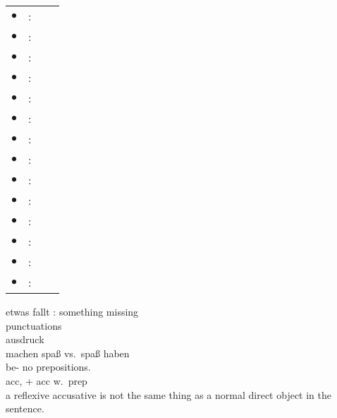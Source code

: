 \documentclass[a4paper,twocolumn,10pt]{article}
\begin{document}
\begin{tabularx}{0.95\linewidth}{lllX}
\rowcolor{white} $\bullet$                 & : &                                     & \\
\rowcolor{white} $\bullet$                 & : &                                     & \\
\rowcolor{white} $\bullet$                 & : &                                     & \\
\rowcolor{white} $\bullet$                 & : &                                     & \\
\rowcolor{white} $\bullet$                 & : &                                     & \\
\rowcolor{white} $\bullet$                 & : &                                     & \\
\rowcolor{white} $\bullet$                 & : &                                     & \\
\rowcolor{white} $\bullet$                 & : &                                     & \\
\rowcolor{white} $\bullet$                 & : &                                     & \\
\rowcolor{white} $\bullet$                 & : &                                     & \\
\rowcolor{white} $\bullet$                 & : &                                     & \\
\rowcolor{white} $\bullet$                 & : &                                     & \\
\rowcolor{white} $\bullet$                 & : &                                     & \\
\rowcolor{white} $\bullet$                 & : &                                     & \\



\end{tabularx}
\newline


etwas fallt : something missing\\
punctuations\\
ausdruck\\

machen spaß vs.\ spaß haben\\
be- no prepositions.\\

acc, + acc w.\ prep\\
a reflexive accusative is not the same thing as a normal direct object in the
sentence.\\
\end{document}
